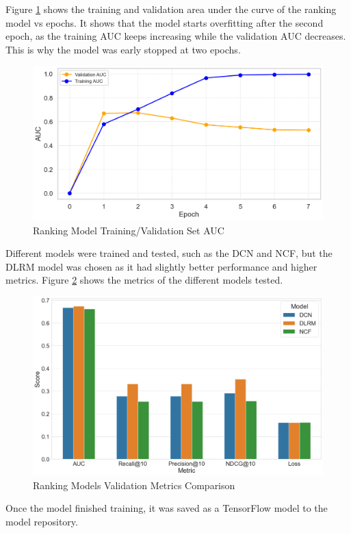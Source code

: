 Figure \ref{fig: RankingModelTraining} shows the training and validation area under the curve of the ranking model vs epochs. It shows that the model starts overfitting after the second epoch, as the training AUC keeps increasing while the validation AUC decreases.
This is why the model was early stopped at two epochs.

\begin{figure}[H]
    \centering
    \includegraphics[width=1\textwidth]{assets/ranking_training_validation_auc.png}
    \caption{Ranking Model Training/Validation Set AUC}
    \label{fig: RankingModelTraining}
\end{figure}

Different models were trained and tested, such as the DCN and NCF, but the DLRM model was chosen as it had slightly better performance and higher metrics.
Figure \ref{fig: RankingModelsResults} shows the metrics of the different models tested.

\begin{figure}[H]
    \centering
    \includegraphics[width=\textwidth]{assets/Validation Metrics Comparison.png}
    \caption{Ranking Models Validation Metrics Comparison}
    \label{fig: RankingModelsResults}
\end{figure}


Once the model finished training, it was saved as a TensorFlow model to the model repository.